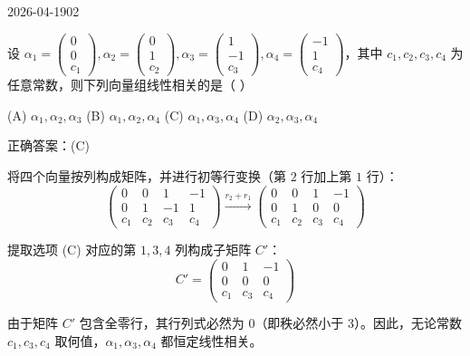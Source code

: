 \begin{mistake}{2026-04-19}{02}

\begin{problemcontent}
设 \(\alpha_1 = \begin{pmatrix} 0 \\ 0 \\ c_1 \end{pmatrix}, \alpha_2 = \begin{pmatrix} 0 \\ 1 \\ c_2 \end{pmatrix}, \alpha_3 = \begin{pmatrix} 1 \\ -1 \\ c_3 \end{pmatrix}, \alpha_4 = \begin{pmatrix} -1 \\ 1 \\ c_4 \end{pmatrix}\)，其中 \(c_1, c_2, c_3, c_4\) 为任意常数，则下列向量组线性相关的是（ \quad ）

(A) \(\alpha_1, \alpha_2, \alpha_3\) \quad
(B) \(\alpha_1, \alpha_2, \alpha_4\) \quad
(C) \(\alpha_1, \alpha_3, \alpha_4\) \quad
(D) \(\alpha_2, \alpha_3, \alpha_4\)
\end{problemcontent}

\begin{solutioncontent}
正确答案：(C)

将四个向量按列构成矩阵，并进行初等行变换（第 \(2\) 行加上第 \(1\) 行）：
\[
\begin{pmatrix}
0 & 0 & 1 & -1 \\
0 & 1 & -1 & 1 \\
c_1 & c_2 & c_3 & c_4
\end{pmatrix}
\xrightarrow{r_2+r_1}
\begin{pmatrix}
0 & 0 & 1 & -1 \\
0 & 1 & 0 & 0 \\
c_1 & c_2 & c_3 & c_4
\end{pmatrix}
\]

提取选项 (C) 对应的第 \(1, 3, 4\) 列构成子矩阵 \(C'\)：
\[
C' = \begin{pmatrix}
0 & 1 & -1 \\
0 & 0 & 0 \\
c_1 & c_3 & c_4
\end{pmatrix}
\]

由于矩阵 \(C'\) 包含全零行，其行列式必然为 \(0\)（即秩必然小于 \(3\)）。因此，无论常数 \(c_1, c_3, c_4\) 取何值，\(\alpha_1, \alpha_3, \alpha_4\) 都恒定线性相关。
\end{solutioncontent}


\end{mistake}
